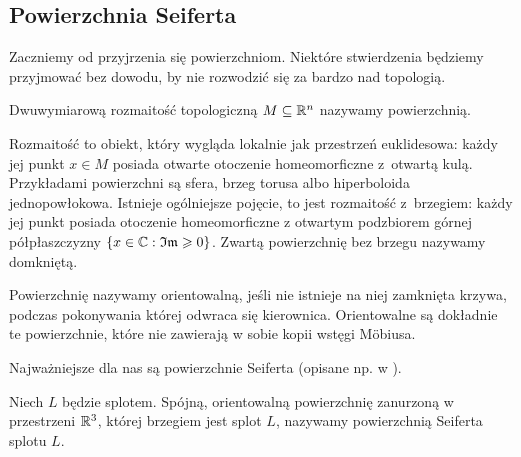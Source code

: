 
\subsection{Powierzchnia Seiferta}
Zaczniemy od przyjrzenia się powierzchniom.
Niektóre stwierdzenia będziemy przyjmować bez dowodu, by nie rozwodzić się za bardzo nad topologią.

\begin{definition}
%
    Dwuwymiarową rozmaitość topologiczną $M \subseteq \mathbb R^n$ nazywamy powierzchnią.
\end{definition}

Rozmaitość to obiekt, który wygląda lokalnie jak przestrzeń euklidesowa: każdy jej punkt $x \in M$ posiada otwarte otoczenie homeomorficzne z~otwartą kulą.
Przykładami powierzchni są sfera, brzeg torusa albo hiperboloida jednopowłokowa.
Istnieje ogólniejsze pojęcie, to jest rozmaitość z~brzegiem: każdy jej punkt posiada otoczenie homeomorficzne z otwartym podzbiorem górnej półpłaszczyzny $\{x \in \mathbb C: \mathfrak {Im} \geqslant 0\}$.
Zwartą powierzchnię bez brzegu nazywamy domkniętą.

Powierzchnię nazywamy orientowalną, jeśli nie istnieje na niej zamknięta krzywa, podczas pokonywania której odwraca się kierownica.
%
Orientowalne są dokładnie te powierzchnie, które nie zawierają w sobie kopii wstęgi Möbiusa.

%
Najważniejsze dla nas są powierzchnie Seiferta (opisane np. w \cite[s. 46-72]{kawauchi1996}).

\begin{definition}
    Niech $L$ będzie splotem.
    Spójną, orientowalną powierzchnię zanurzoną w przestrzeni $\mathbb R^3$, której brzegiem jest splot $L$, nazywamy powierzchnią Seiferta splotu $L$.
\end{definition}


